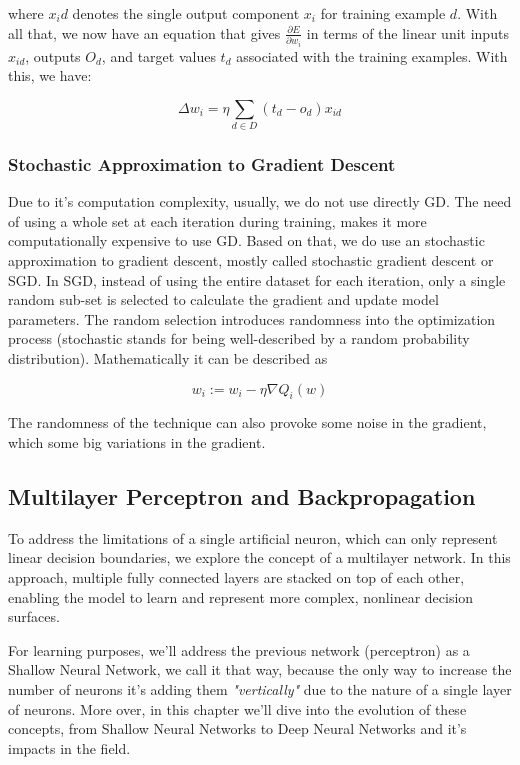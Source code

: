 \documentclass{article}
\begin{document}
where $x_id$ denotes the single output component $x_i$ for training example $d$. With all that, we now have an equation that gives $\frac{\partial E}{\partial w_i}$ in terms of the linear unit inputs $x_{id}$, outputs $O_d$, and target values $t_d$ associated with the training examples. With this, we have:

\begin{equation}
    \Delta w_i = \eta \sum_{d \in D} (t_d - o_d)x_{id}
\end{equation}

\subsubsection{Stochastic Approximation to Gradient Descent}
Due to it's computation complexity, usually, we do not use directly GD. The need of using a whole set at each iteration during training, makes it more computationally expensive to use GD. Based on that, we do use an stochastic approximation to gradient descent, mostly called stochastic gradient descent or SGD.
In SGD, instead of using the entire dataset for each iteration, only a single random sub-set is selected to calculate the gradient and update model parameters. The random selection introduces randomness into the optimization process (stochastic stands for being well-described by a random probability distribution). Mathematically it can be described as

\begin{equation}
    w_i := w_i - \eta \nabla Q_i (w)
\end{equation}

The randomness of the technique can also provoke some noise in the gradient, which some big variations in the gradient.

\subsection{Multilayer Perceptron and Backpropagation}
To address the limitations of a single artificial neuron, which can only represent linear decision boundaries, we explore the concept of a multilayer network. In this approach, multiple fully connected layers are stacked on top of each other, enabling the model to learn and represent more complex, nonlinear decision surfaces.

For learning purposes, we'll address the previous network (perceptron) as a Shallow Neural Network, we call it that way, because the only way to increase the number of neurons it's adding them \textit{"vertically"} due to the nature of a single layer of neurons. More over, in this chapter we'll dive into the evolution of these concepts, from Shallow Neural Networks to Deep Neural Networks and it's impacts in the field.
\end{document}
